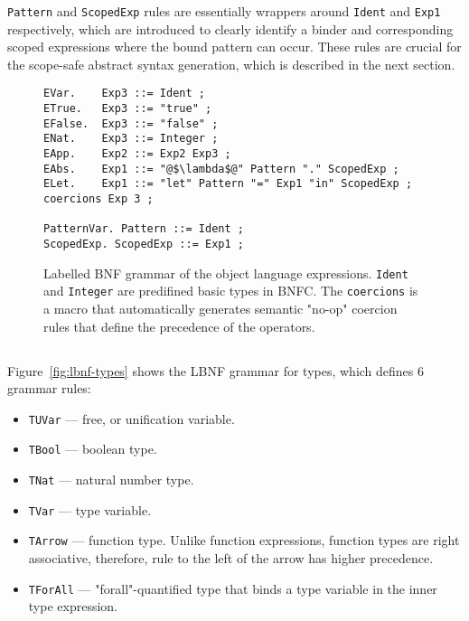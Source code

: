 \texttt{Pattern} and \texttt{ScopedExp} rules are essentially wrappers around \texttt{Ident} and \texttt{Exp1} respectively, which are introduced to clearly identify a binder and corresponding scoped expressions where the bound pattern can occur. These rules are crucial for the scope-safe abstract syntax generation, which is described in the next section.

\begin{figure}[H]
  \begin{verbatim}
EVar.    Exp3 ::= Ident ;
ETrue.   Exp3 ::= "true" ;
EFalse.  Exp3 ::= "false" ;
ENat.    Exp3 ::= Integer ;
EApp.    Exp2 ::= Exp2 Exp3 ;
EAbs.    Exp1 ::= "@$\lambda$@" Pattern "." ScopedExp ;
ELet.    Exp1 ::= "let" Pattern "=" Exp1 "in" ScopedExp ;
coercions Exp 3 ;

PatternVar. Pattern ::= Ident ;
ScopedExp. ScopedExp ::= Exp1 ;
  \end{verbatim}
  \caption[LBNF grammar of the object language expressions]{Labelled BNF grammar of the object language expressions. \texttt{Ident} and \texttt{Integer} are predifined basic types in BNFC. The \texttt{coercions} is a macro that automatically generates semantic "no-op" coercion rules that define the precedence of the operators.}
  \label{fig:lbnf-terms}
\end{figure}


\subsection{}

Figure~\ref{fig:lbnf-types} shows the LBNF grammar for types, which defines 6 grammar rules:

\begin{itemize}
  \item \texttt{TUVar} — free, or unification variable.
  \item \texttt{TBool} — boolean type.
  \item \texttt{TNat} — natural number type.
  \item \texttt{TVar} — type variable.
  \item \texttt{TArrow} — function type. Unlike function expressions, function types are right associative, therefore, rule to the left of the arrow has higher precedence.
  \item \texttt{TForAll} — "forall"-quantified type that binds a type variable in the inner type expression.
\end{itemize}

